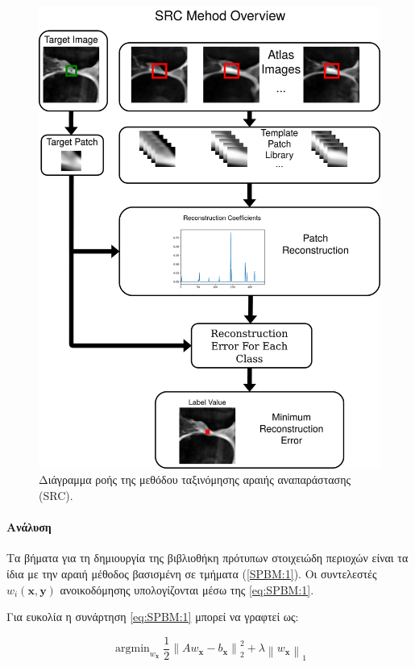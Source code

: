 \documentclass[a4paper,12pt]{article}
\newcommand{\paragraphLine}[1]{\paragraph{#1}\mbox{}}
\newcommand{\argminB}{\mathop{\mathrm{argmin}}}
\newcommand\norm[1]{\left\lVert#1\right\rVert}
\begin{document}
\begin{figure}[H]
    \centering
    \includegraphics[width=\linewidth]{SRC_method.png}
    \caption{Διάγραμμα ροής της μεθόδου ταξινόμησης αραιής αναπαράστασης (SRC).}
    \label{fig:SRC_method:1}
\end{figure}

\paragraphLine{Ανάλυση}

Τα βήματα για τη δημιουργία της βιβλιοθήκη πρότυπων στοιχειώδη περιοχών είναι τα
ίδια με την αραιή μέθοδος βασισμένη σε τμήματα (\ref{SPBM:1}). Οι συντελεστές
$w_i(\bm{x},\bm{y})$ ανοικοδόμησης υπολογίζονται μέσω της \eqref{eq:SPBM:1}.

Για ευκολία η συνάρτηση \eqref{eq:SPBM:1} μπορεί να γραφτεί ως:

\begin{equation} \label{eq:SPBM:2}
    \argminB_{w_{\bm{x}}} { \frac{1} {2} \norm { A w_{\bm{x}} - b_{\bm{x}} }_2^2
              + \lambda \norm{w_{\bm{x}}}_1 }
\end{equation}
\end{document}
